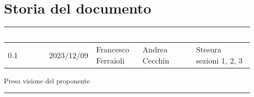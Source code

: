 \section{Storia del documento} \label{sec:storia}
\begingroup
\setlength{\tabcolsep}{10pt}
\renewcommand{\arraystretch}{1.5}
\begin{tabularx}{\textwidth}{| l | l | X | X | X |}
    \hline
    \rowcolor{headerrow} \textbf{\textcolor{white}{Versione}} & \textbf{\textcolor{white}{Data}} & \textbf{\textcolor{white}{Autori}} & \textbf{\textcolor{white}{Verificatori}} & \textbf{\textcolor{white}{Descrizione}} \\
    \hline
    0.1 & 2023/12/09 & Francesco Ferraioli & Andrea Cecchin & Stesura sezioni 1, 2, 3\\
    \hline
\end{tabularx}
\endgroup
\begin{flushright}
\vspace{15pt}
Presa visione del proponente\\
\vspace{38pt}
\rule[10pt]{148pt}{0.4pt}
\end{flushright}